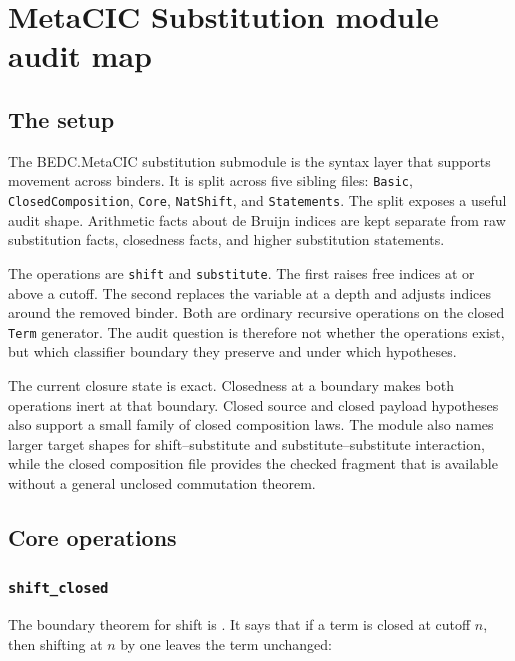 \chapter{MetaCIC Substitution module audit map}
\label{ch:metacic-substitution-audit-map}

\section{The setup}
\label{sec:metacic-substitution-audit-map-setup}

The BEDC.MetaCIC substitution submodule is the syntax layer that supports
movement across binders. It is split across five sibling files:
\texttt{Basic}, \texttt{ClosedComposition}, \texttt{Core},
\texttt{NatShift}, and \texttt{Statements}. The split exposes a useful audit
shape. Arithmetic facts about de Bruijn indices are kept separate from raw
substitution facts, closedness facts, and higher substitution statements.

The operations are \texttt{shift} and \texttt{substitute}. The first raises
free indices at or above a cutoff. The second replaces the variable at a
depth and adjusts indices around the removed binder. Both are ordinary
recursive operations on the closed \texttt{Term} generator. The audit question
is therefore not whether the operations exist, but which classifier boundary
they preserve and under which hypotheses.

The current closure state is exact. Closedness at a boundary makes both
operations inert at that boundary. Closed source and closed payload hypotheses
also support a small family of closed composition laws. The module also names
larger target shapes for shift--substitute and substitute--substitute
interaction, while the closed composition file provides the checked fragment
that is available without a general unclosed commutation theorem.

\section{Core operations}
\label{sec:metacic-substitution-audit-map-core-operations}

\subsection{\texttt{shift\_closed}}
\label{subsec:metacic-substitution-audit-map-shift-closed}

The boundary theorem for shift is
. It says that if a term is closed at
cutoff $n$, then shifting at $n$ by one leaves the term unchanged:

